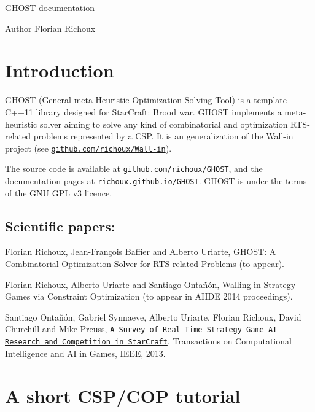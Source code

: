 G\-H\-O\-S\-T documentation \begin{DoxyAuthor}{Author}
Florian Richoux
\end{DoxyAuthor}
\section*{Introduction }

G\-H\-O\-S\-T (General meta-\/\-Heuristic Optimization Solving Tool) is a template C++11 library designed for Star\-Craft\-: Brood war. G\-H\-O\-S\-T implements a meta-\/heuristic solver aiming to solve any kind of combinatorial and optimization R\-T\-S-\/related problems represented by a C\-S\-P. It is an generalization of the Wall-\/in project (see \href{https://github.com/richoux/Wall-in}{\tt github.\-com/richoux/\-Wall-\/in}).

The source code is available at \href{https://github.com/richoux/GHOST}{\tt github.\-com/richoux/\-G\-H\-O\-S\-T}, and the documentation pages at \href{http://richoux.github.io/GHOST}{\tt richoux.\-github.\-io/\-G\-H\-O\-S\-T}. G\-H\-O\-S\-T is under the terms of the G\-N\-U G\-P\-L v3 licence.

\subsection*{Scientific papers\-: }


\begin{DoxyItemize}
\item Florian Richoux, Jean-\/\-François Baffier and Alberto Uriarte, G\-H\-O\-S\-T\-: A Combinatorial Optimization Solver for R\-T\-S-\/related Problems (to appear).
\item Florian Richoux, Alberto Uriarte and Santiago Ontañón, Walling in Strategy Games via Constraint Optimization (to appear in A\-I\-I\-D\-E 2014 proceedings).
\item Santiago Ontañón, Gabriel Synnaeve, Alberto Uriarte, Florian Richoux, David Churchill and Mike Preuss, \href{http://pagesperso.lina.univ-nantes.fr/~richoux-f/publications/tciaig13.pdf}{\tt A Survey of Real-\/\-Time Strategy Game A\-I Research and Competition in Star\-Craft}, Transactions on Computational Intelligence and A\-I in Games, I\-E\-E\-E, 2013.
\end{DoxyItemize}

\section*{A short C\-S\-P/\-C\-O\-P tutorial }

